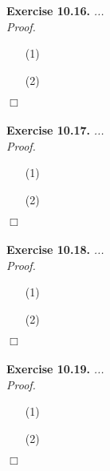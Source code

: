 \documentclass{article}
\begin{document}



\textbf{Exercise 10.16.}
\emph{...} \\

\emph{Proof.}
\begin{enumerate}
\item[(1)]
\item[(2)]

\end{enumerate}
$\Box$ \\\\






\textbf{Exercise 10.17.}
\emph{...} \\

\emph{Proof.}
\begin{enumerate}
\item[(1)]
\item[(2)]

\end{enumerate}
$\Box$ \\\\






\textbf{Exercise 10.18.}
\emph{...} \\

\emph{Proof.}
\begin{enumerate}
\item[(1)]
\item[(2)]

\end{enumerate}
$\Box$ \\\\






\textbf{Exercise 10.19.}
\emph{...} \\

\emph{Proof.}
\begin{enumerate}
\item[(1)]
\item[(2)]

\end{enumerate}
$\Box$ \\\\
\end{document}
